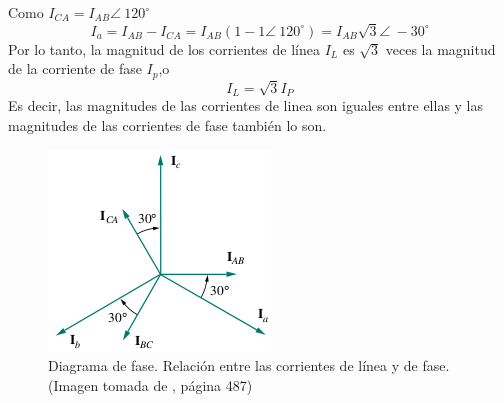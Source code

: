 \documentclass[twocolumn]{IEEEtran}
\begin{document}
\noindent
Como $I_{CA} = I_{AB} \angle\ 120^\circ$
\begin{equation}
 I_a =I_{AB} - I_{CA} = I_{AB}(1 - 1\angle\ 120^\circ) = I_{AB} \sqrt{3}\angle\ -30^\circ
\label{ecu26}
\end{equation}
\noindent
Por lo tanto, la magnitud de los corrientes de línea $I_L$ es $\sqrt{3}$ veces la magnitud de la corriente de fase $I_p$, ​​o
\begin{equation}
 I_L = \sqrt{3} I_{P}
\label{ecu27}
\end{equation}
\noindent
Es decir, las magnitudes de las corrientes de linea son iguales entre ellas y las magnitudes de las corrientes de fase también lo son.
\begin{figure}[H]
	\centering
		\includegraphics[scale=0.7]{diagramacorrientes.png}
	\caption{Diagrama de fase. Relación entre las corrientes de línea y de fase. (Imagen tomada de \cite{sadiku}, página 487)}
	\label{fig10}
\end{figure}
\end{document}

